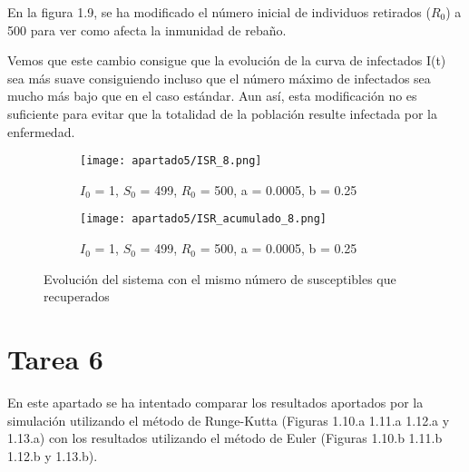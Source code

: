 \newpage

En la figura 1.9, se ha modificado el número inicial de individuos retirados ($R_0$) a 500 para ver como afecta la inmunidad de rebaño.

Vemos que este cambio consigue que la evolución de la curva de infectados I(t) sea más suave consiguiendo incluso que el número máximo de infectados sea mucho más bajo que en el caso estándar. Aun así, esta modificación no es suficiente para evitar que la totalidad de la población resulte infectada por la enfermedad.

\begin{figure}[H]
	\centering
	\begin{subfigure}[b]{0.8\textwidth}
		\centering
		\texttt{[image: apartado5/ISR\_8.png]}
		\caption{$I_0$ = 1, $S_0$ = 499, $R_0$ = 500, a = 0.0005, b = 0.25}
	\end{subfigure}
	\hfill
	\begin{subfigure}[b]{0.8\textwidth}
		\centering
		\texttt{[image: apartado5/ISR\_acumulado\_8.png]}
		\caption{$I_0$ = 1, $S_0$ = 499, $R_0$ = 500, a = 0.0005, b = 0.25}
	\end{subfigure}
	\caption{Evolución del sistema con el mismo número de susceptibles que recuperados}
\end{figure}

\newpage

\section{Tarea 6}
En este apartado se ha intentado comparar los resultados aportados por la simulación utilizando el método de Runge-Kutta (Figuras 1.10.a 1.11.a 1.12.a y 1.13.a) con los resultados utilizando el método de Euler (Figuras 1.10.b 1.11.b 1.12.b y 1.13.b).


